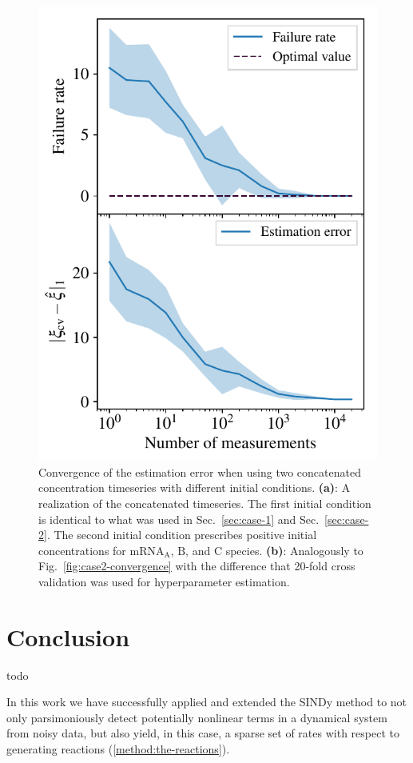 \documentclass[oneside, abstracton, titlepage]{scrartcl}
\newenvironment{colbox}[1]
{\newcommand\colboxcolor{#1}%
	\begin{lrbox}{\selvestebox}%
		\begin{minipage}{\dimexpr\columnwidth-2\fboxsep\relax}}
		{\end{minipage}\end{lrbox}%
	\begin{center}
		\colorbox[HTML]{\colboxcolor}{\usebox{\selvestebox}}
\end{center}}
\begin{document}
	\begin{figure}
		\centering
		\includegraphics[width=\columnwidth]{./figures_tex/case3}
		\caption{Convergence of the estimation error when using two concatenated concentration timeseries with different initial conditions. \textbf{(a)}: A realization of the concatenated timeseries. The first initial condition is identical to what was used in Sec.~\ref{sec:case-1} and Sec.~\ref{sec:case-2}. The second initial condition prescribes positive initial concentrations for $\mathrm{mRNA}_\mathrm{A}$, $\mathrm{B}$, and $\mathrm{C}$ species. \textbf{(b)}: Analogously to Fig.~\ref{fig:case2-convergence} with the difference that 20-fold cross validation was used for hyperparameter estimation.}
	\end{figure}
    
	\section{Conclusion}
	\begin{colbox}{F8E0E0}
		todo
	\end{colbox}
	In this work we have successfully applied and extended the SINDy method to not only parsimoniously detect potentially nonlinear terms in a dynamical system from noisy data, but also yield, in this case, a sparse set of rates with respect to generating reactions (\ref{method:the-reactions}).
\end{document}
